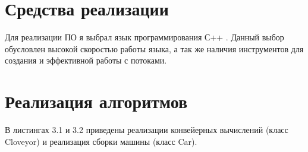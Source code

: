 \documentclass[12pt]{report}
\begin{document}
\section{Средства реализации}

Для реализации ПО я выбрал язык программирования С++ \cite{C++}. Данный выбор обусловлен высокой скоростью работы языка, а так же наличия инструментов для создания и эффективной работы с потоками.

\section{Реализация алгоритмов}

В листингах 3.1 и 3.2 приведены реализации конвейерных вычислений (класс Cloveyor) и реализация сборки машины (класс Car).
\end{document}
